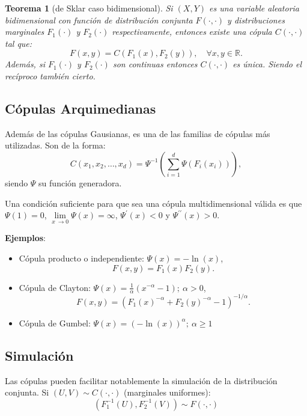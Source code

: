 \documentclass[
  spanish,
  10pt,
]{book}
\theoremstyle{break}
\newtheorem{theorem}{Teorema}[chapter]
\theoremstyle{nonumberplain}
\begin{document}
\begin{theorem}[de Sklar caso bidimensional]
\protect\hypertarget{thm:sklar}{}\label{thm:sklar}
Si \((X,Y)\) es una variable aleatoria bidimensional con función de distribución conjunta \(F(\cdot,\cdot)\) y distribuciones marginales \(F_1(\cdot)\) y \(F_2(\cdot)\) respectivamente, entonces existe una cópula \(C(\cdot,\cdot)\) tal que:
\[F(x,y)=C\left( F_1(x),F_2(y)\right) ,\quad \forall x,y\in\mathbb{R}.\]
Además, si \(F_1(\cdot)\) y \(F_2(\cdot)\) son continuas entonces \(C(\cdot,\cdot)\) es única.
Siendo el recíproco también cierto.
\end{theorem}

\subsection{Cópulas Arquimedianas}\label{cuxf3pulas-arquimedianas}

Además de las cópulas Gausianas, es una de las familias de cópulas más utilizadas.
Son de la forma:
\[C(x_1,x_2,\dots,x_d)
= \Psi^{-1}\left( \sum_{i=1}^d\Psi\left( F_i(x_i)\right)\right),\]
siendo \(\Psi\) su función generadora.

Una condición suficiente para que sea una cópula multidimensional válida es que \(\Psi(1)=0\), \(\lim \limits_{x\ \rightarrow0}\Psi(x)= \infty\), \(\Psi^{\prime}(x)<0\) y \(\Psi^{\prime \prime}(x)>0\).

\textbf{Ejemplos}:

\begin{itemize}
\item
  Cópula producto o independiente:
  \(\Psi(x)=-\ln(x)\),
  \[F(x,y)=F_1(x)F_2(y).\]
\item
  Cópula de Clayton:
  \(\Psi(x)= \frac{1}{\alpha}\left( x^{-\alpha}-1\right) ;\ \alpha>0\),
  \[F(x,y)=(F_1(x)^{-\alpha}+F_2(y)^{-\alpha}-1)^{-1/\alpha}.\]
\item
  Cópula de Gumbel:
  \(\Psi(x)= \left( -\ln(x)\right)^{\alpha} ;\ \alpha \geq1\)
\end{itemize}

\subsection{Simulación}\label{simulaciuxf3n}

Las cópulas pueden facilitar notablemente la simulación de la distribución conjunta.
Si \((U,V)\sim C(\cdot,\cdot)\) (marginales uniformes):
\[\left( F_1^{-1}(U),F_2^{-1}(V)\right)  \sim F(\cdot,\cdot)\]
\end{document}

